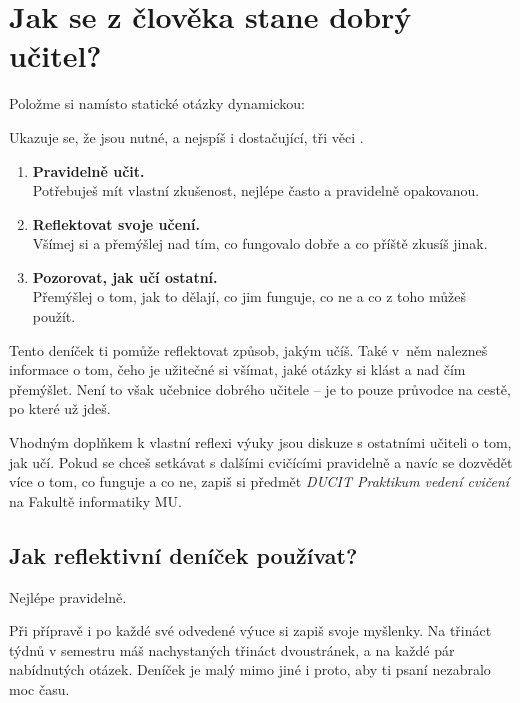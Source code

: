 \documentclass[twoside,openany]{book}
\newlength{\spc} %
\newcommand{\punct}[1]{%
  \settowidth{\spc}{#1}%
  \addtolength{\spc}{-1.8\spc}%
  #1%
  \hspace*{\spc}%
}
\begin{document}

\chapter*{Jak se z člověka stane dobrý učitel?}

\vspace*{1em}
Položme si namísto statické otázky dynamickou:

\vspace*{1em}
\textit{\large {}}

\vspace*{1em}
Ukazuje se, že jsou nutné, a nejspíš i dostačující, tři věci\punct{.}\footnotemark
{}
\begin{enumerate}
\item \textbf{Pravidelně učit.} \\Potřebuješ mít vlastní zkušenost, nejlépe často a pravidelně opakovanou.
\item \textbf{Reflektovat svoje učení.} \\Všímej si a přemýšlej nad tím, co fungovalo dobře a co příště zkusíš jinak.
\item \textbf{Pozorovat, jak učí ostatní.} \\Přemýšlej o tom, jak to dělají, co jim funguje, co ne a co z toho můžeš použít.
\end{enumerate}

Tento deníček ti pomůže reflektovat způsob, jakým učíš. Také v~něm nalezneš informace o tom, čeho je užitečné si všímat, jaké otázky si klást a nad čím přemýšlet. Není to však učebnice dobrého učitele -- je to pouze průvodce na cestě, po které už jdeš.

Vhodným doplňkem k vlastní reflexi výuky jsou diskuze s ostatními učiteli o tom, jak učí. Pokud se chceš setkávat s dalšími cvičícími pravidelně a navíc se dozvědět více o tom, co funguje a co ne, zapiš si předmět \textit{DUCIT Praktikum vedení cvičení} na Fakultě informatiky MU.

\newpage
\section*{Jak reflektivní deníček používat?}

Nejlépe pravidelně.

Při přípravě i po každé své odvedené výuce si zapiš svoje myšlenky. Na třináct týdnů v semestru máš nachystaných třináct dvoustránek, a na každé pár nabídnutých otázek. Deníček je malý mimo jiné i proto, aby ti psaní nezabralo moc času.
\end{document}
